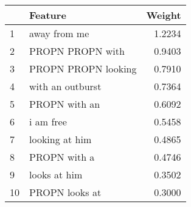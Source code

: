 \begin{tabular}{llr}
\toprule
{} &              Feature &  Weight \\
\midrule
1  &         away from me &  1.2234 \\
2  &     PROPN PROPN with &  0.9403 \\
3  &  PROPN PROPN looking &  0.7910 \\
4  &     with an outburst &  0.7364 \\
5  &        PROPN with an &  0.6092 \\
6  &            i am free &  0.5458 \\
7  &       looking at him &  0.4865 \\
8  &         PROPN with a &  0.4746 \\
9  &         looks at him &  0.3502 \\
10 &       PROPN looks at &  0.3000 \\
\bottomrule
\end{tabular}
